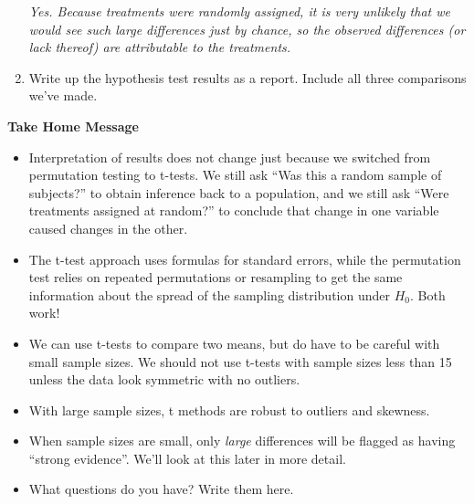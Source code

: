 \begin{enumerate}
\begin{key}
  {\it  Yes.  Because treatments were randomly assigned, it is very
    unlikely that we would see such large differences just by chance,
    so the observed differences (or lack thereof) are attributable to
    the treatments.  }
\end{key}


\item Write up the hypothesis test results as a report.  Include all
  three comparisons we've made. \vfill
   
 \end{enumerate}
 \newpage

\begin{center}
  {\large\bf Take Home Message}
\end{center}

\begin{itemize}
  \item Interpretation of results does not change just because we
    switched from permutation testing to t-tests.  We still ask ``Was
    this a random sample of subjects?'' to obtain inference back to a
    population, and we still ask ``Were treatments assigned at
    random?'' to conclude that change in one variable caused changes
    in the other. 
  \item The t-test approach uses formulas for standard errors, while
    the permutation test relies on repeated permutations or resampling
    to get the same information about the spread of the sampling
    distribution under $H_0$.  Both work!
  \item We can use t-tests to compare two means, but do have to be
    careful with small sample sizes.  We should not use t-tests with
    sample sizes less than 15 unless the data look symmetric with no
    outliers.
  \item With large sample sizes, t methods are robust to outliers and
    skewness.
  \item When sample sizes are small, only {\em large} differences will
    be flagged as having ``strong evidence''.  We'll look at this
    later in more detail.
  \item What questions do you have?  Write them here.
\end{itemize}


